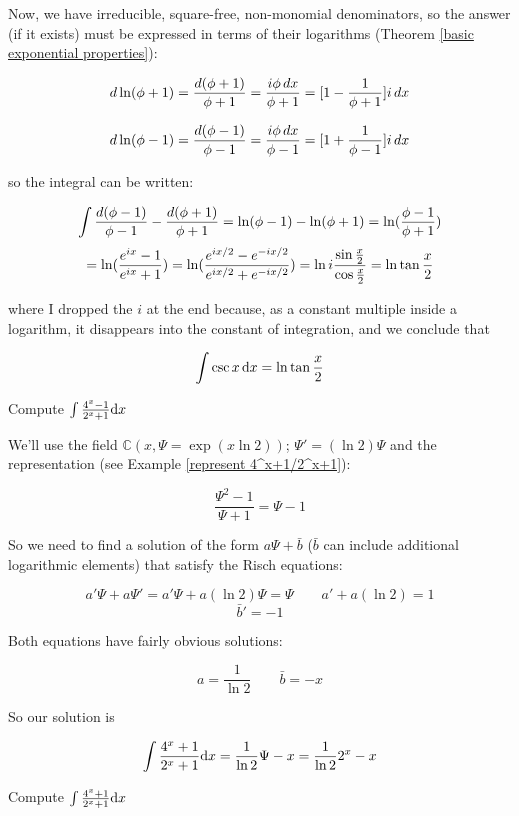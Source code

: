 Now, we have irreducible, square-free, non-monomial denominators, so
the answer (if it exists) must be expressed in terms of their
logarithms (Theorem \ref{basic exponential properties}):

$$ d \ln(\phi+1) = {{d(\phi+1)}\over{\phi+1}} = {{i\phi\,dx}\over{\phi+1}} = [1 - {{1}\over{\phi+1}}]i\,dx$$

$$ d \ln(\phi-1) = {{d(\phi-1)}\over{\phi-1}} = {{i\phi\,dx}\over{\phi-1}} = [1 + {{1}\over{\phi-1}}]i\,dx$$

so the integral can be written:

$$\int {{d(\phi-1)}\over{\phi-1}} - {{d(\phi+1)}\over{\phi+1}} = \ln (\phi-1) - \ln(\phi+1) = \ln({{\phi-1}\over{\phi+1}})$$
$$ = \ln ({{e^{ix}-1}\over{e^{ix}+1}}) = \ln ({{e^{ix/2}-e^{-ix/2}}\over{e^{ix/2}+e^{-ix/2}}}) = \ln i {{\sin {x\over2}}\over{\cos {x\over2}}} = \ln \tan {x\over2} $$

where I dropped the $i$ at the end because, as a constant multiple
inside a logarithm, it disappears into the constant of integration,
and we conclude that

$$\int \csc x \,{\rm d}x = \ln \tan {x\over2} $$

\endexample

\vfil\eject

\example Compute $\int {{4^x-1}\over{2^x+1}} {\rm d}x$
\label{integrate 4^x-1/2^x+1}

We'll use the field ${\mathbb C}(x,\Psi = \exp(x \ln 2))$; $\Psi' =
(\ln 2)\Psi$ and the representation (see Example
\ref{represent 4^x+1/2^x+1}):

$$ \frac{\Psi^2-1}{\Psi+1} = \Psi-1$$

So we need to find a solution of the form $a\Psi + \bar{b}$ ($\bar{b}$
can include additional logarithmic elements) that satisfy the Risch
equations:

$$a'\Psi + a\Psi' = a'\Psi + a(\ln 2)\Psi = \Psi \qquad a' + a(\ln 2) = 1$$
$$\bar{b}' = -1$$

Both equations have fairly obvious solutions:

$$a = \frac{1}{\ln 2} \qquad \bar{b}=-x$$

So our solution is

$$\int {{4^x+1}\over{2^x+1}} {\rm d}x = \frac{1}{\ln 2}\Psi - x =
\frac{1}{\ln 2}2^x - x$$

\endexample


\vfil\eject

\example Compute $\int {{4^x+1}\over{2^x+1}} {\rm d}x$
\label{integrate 4^x+1/2^x+1}

